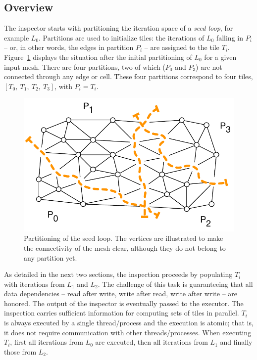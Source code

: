 \subsection*{Overview}
The inspector starts with partitioning the iteration space of a \textit{seed loop}, for example $L_0$. Partitions are used to initialize tiles: the iterations of $L_0$ falling in $P_i$ -- or, in other words, the edges in partition $P_i$ -- are assigned to the tile $T_i$. Figure~\ref{fig:st-initial-part-sm} displays the situation after the initial partitioning of $L_0$ for a given input mesh. There are four partitions, two of which ($P_0$ and $P_3$) are not connected through any edge or cell. These four partitions correspond to four tiles, $[T_0,\ T_1,\ T_2,\ T_3]$, with $P_i = T_i$.

\begin{figure}
\centering
\includegraphics[scale=0.6]{sparsetiling/figures/partiotioned.pdf}
\caption{Partitioning of the seed loop. The vertices are illustrated to make the connectivity of the mesh clear, although they do not belong to any partition yet.}
\label{fig:st-initial-part-sm}
\end{figure}

As detailed in the next two sections, the inspection proceeds by populating $T_i$ with iterations from $L_1$ and $L_2$. The challenge of this task is guaranteeing that all data dependencies -- read after write, write after read, write after write -- are honored. The output of the inspector is eventually passed to the executor. The inspection carries sufficient information for computing sets of tiles in parallel. $T_i$ is always executed by a single thread/process and the execution is atomic; that is, it does not require communication with other threads/processes. When executing $T_i$, first all iterations from $L_0$ are executed, then all iterations from $L_1$ and finally those from $L_2$.

